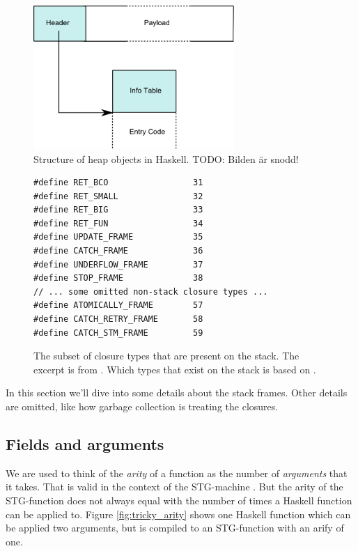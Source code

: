 \begin{figure}
\begin{mdframed}
  \centering
  \includegraphics[width=3.0in]{fig/heap-object}
  \caption{Structure of heap objects in Haskell. TODO: Bilden är snodd!}
  \label{fig:heap_object}
\end{mdframed}
\end{figure}

\begin{figure}
\begin{mdframed}
  \begin{verbatim}
#define RET_BCO                 31
#define RET_SMALL               32
#define RET_BIG                 33
#define RET_FUN                 34
#define UPDATE_FRAME            35
#define CATCH_FRAME             36
#define UNDERFLOW_FRAME         37
#define STOP_FRAME              38
// ... some omitted non-stack closure types ...
#define ATOMICALLY_FRAME        57
#define CATCH_RETRY_FRAME       58
#define CATCH_STM_FRAME         59
  \end{verbatim}
  \caption{The subset of closure types that are present on the stack.
The excerpt is from \cite{github_closure_types}. Which types that exist
on the stack is based on \cite{github_scavenge_stack}.}
  \label{fig:stack_types}
\end{mdframed}
\end{figure}


In this section we'll dive into
some details about the stack frames. Other details
are omitted, like how garbage collection is treating the closures.

\subsection{Fields and arguments}

We are used to think of the \emph{arity} of a function as the number
of \emph{arguments} that it takes. That is valid in the context
of the STG-machine \cite{commentary_function_calls}. But the arity
of the STG-function does not always equal with the number of times
a Haskell function can be applied to. Figure \ref{fig:tricky_arity}
shows one Haskell function which can be applied two arguments, but
is compiled to an STG-function with an arify of one.

